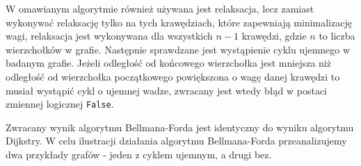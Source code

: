 \documentclass[12pt,a4paper]{book}
\theoremstyle{definition}
\numberwithin{equation}{chapter}
\begin{document}
W omawianym algorytmie również używana jest relaksacja, lecz zamiast wykonywać relaksację tylko na tych krawędziach, które zapewniają minimalizację wagi, relaksacja jest wykonywana dla wszystkich $n - 1$ krawędzi, gdzie $n$ to liczba wierzchołków w grafie. Następnie sprawdzane jest wystąpienie cyklu ujemnego w badanym grafie. Jeżeli odległość od końcowego wierzchołka jest mniejsza niż odległość od wierzchołka początkowego powiększona o wagę danej krawędzi to musiał wystąpić cykl o ujemnej wadze, zwracany jest wtedy błąd w postaci zmiennej logicznej \texttt{False}.

Zwracany wynik algorytmu Bellmana-Forda jest identyczny do wyniku algorytmu Dijkstry. W celu ilustracji działania algorytmu Bellmana-Forda przeanalizujemy dwa przykłady grafów - jeden z cyklem ujemnym, a drugi bez.
\end{document}
